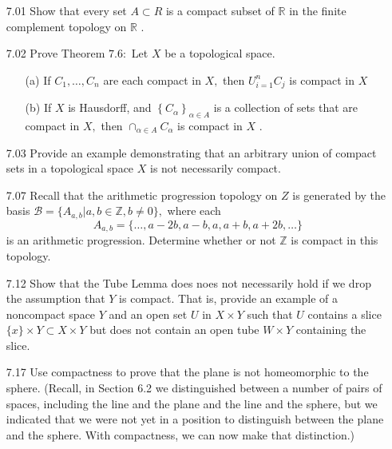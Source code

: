 \documentclass[12pt]{article}
\newcommand{\Z}{\mathbb{Z}}
\newcommand{\B}{\mathcal{B}}
\begin{document}
	\pagestyle{fancy}  
	\lfoot{} \cfoot{} \rfoot{}
	
	\begin{enumerate}
		\item[7.01] Show that every set $A \subset R$ is a compact subset of $\mathbb { R }$ in the finite complement
		topology on $\mathbb { R }$ .
		
		\item[7.02] Prove Theorem $7.6 :$ Let $X$ be a topological space.
		\begin{enumerate}
			\item[(a)] If $C _ { 1 } , \ldots , C _ { n }$ are each compact in $X ,$ then $U _ { i = 1 } ^ { n } C _ { j }$ is compact in $X$
			\item[(b)] If $X$ is Hausdorff, and $\left\{ C _ { \alpha } \right\} _ { \alpha \in A }$ is a collection of sets that are compact in
			$X ,$ then $\cap _ { \alpha \in A } C _ { \alpha }$ is compact in $X$ .
		\end{enumerate}
		
		\item[7.03] Provide an example demonstrating that an arbitrary union of compact sets in a
		topological space $X$ is not necessarily compact.
		
		\item[7.07] Recall that the arithmetic progression topology on $Z$ is generated by the basis $\B = \{ A _ { a , b } | a , b \in \Z , b \neq 0 \} ,$ where each
			\[A_{a,b} = \{ \ldots , a - 2 b , a - b , a , a + b , a + 2 b , \ldots \}\]
		is an arithmetic progression. Determine whether or not $ \Z $ is compact in this
		topology.
		\item[7.12] Show that the Tube Lemma does noes not necessarily hold if we drop the assumption that $Y$ is compact. That is, provide an example of a noncompact space $Y$ and
		an open set $U$ in $X \times Y$ such that $U$ contains a slice $\{ x \} \times Y \subset X \times Y$ but does
		not contain an open tube $W \times Y$ containing the slice.
		
		\item[7.17] Use compactness to prove that the plane is not homeomorphic to the sphere.
		(Recall, in Section 6.2 we distinguished between a number of pairs of spaces, including the line and the plane and the line and the sphere, but we indicated that we were not yet in a position to distinguish between the plane and the sphere. With compactness, we can now make that distinction.)
		

\end{enumerate}
\end{document}
